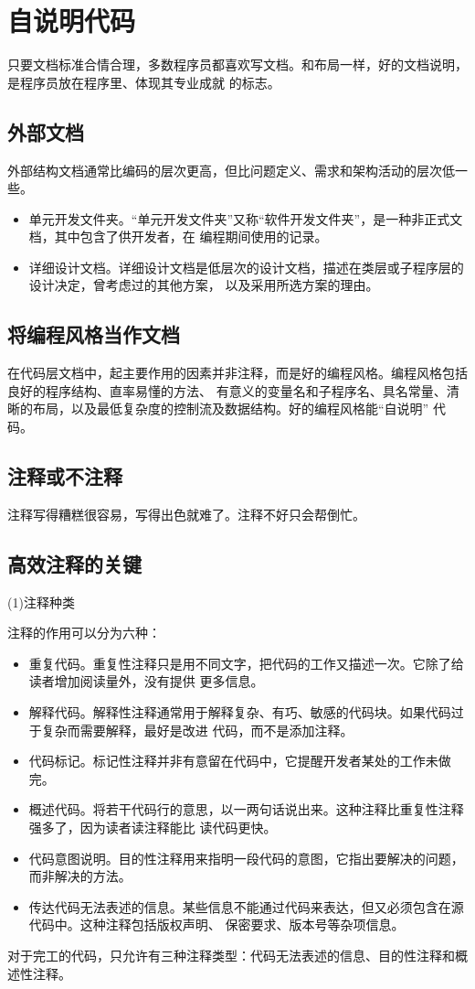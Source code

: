 \documentclass{article}
\begin{document}
\section{自说明代码}
只要文档标准合情合理，多数程序员都喜欢写文档。和布局一样，好的文档说明，是程序员放在程序里、体现其专业成就
的标志。
\subsection{外部文档}
外部结构文档通常比编码的层次更高，但比问题定义、需求和架构活动的层次低一些。
\begin{itemize}
    \item 单元开发文件夹。“单元开发文件夹”又称“软件开发文件夹”，是一种非正式文档，其中包含了供开发者，在
    编程期间使用的记录。
    \item 详细设计文档。详细设计文档是低层次的设计文档，描述在类层或子程序层的设计决定，曾考虑过的其他方案，
    以及采用所选方案的理由。
\end{itemize}

\subsection{将编程风格当作文档}
在代码层文档中，起主要作用的因素并非注释，而是好的编程风格。编程风格包括良好的程序结构、直率易懂的方法、
有意义的变量名和子程序名、具名常量、清晰的布局，以及最低复杂度的控制流及数据结构。好的编程风格能“自说明”
代码。

\subsection{注释或不注释}
注释写得糟糕很容易，写得出色就难了。注释不好只会帮倒忙。

\subsection{高效注释的关键}
\par
(1)注释种类
\par
注释的作用可以分为六种：
\begin{itemize}
    \item 重复代码。重复性注释只是用不同文字，把代码的工作又描述一次。它除了给读者增加阅读量外，没有提供
    更多信息。
    \item 解释代码。解释性注释通常用于解释复杂、有巧、敏感的代码块。如果代码过于复杂而需要解释，最好是改进
    代码，而不是添加注释。
    \item 代码标记。标记性注释并非有意留在代码中，它提醒开发者某处的工作未做完。
    \item 概述代码。将若干代码行的意思，以一两句话说出来。这种注释比重复性注释强多了，因为读者读注释能比
    读代码更快。
    \item 代码意图说明。目的性注释用来指明一段代码的意图，它指出要解决的问题，而非解决的方法。
    \item 传达代码无法表述的信息。某些信息不能通过代码来表达，但又必须包含在源代码中。这种注释包括版权声明、
    保密要求、版本号等杂项信息。
\end{itemize}
对于完工的代码，只允许有三种注释类型：代码无法表述的信息、目的性注释和概述性注释。
\end{document}
